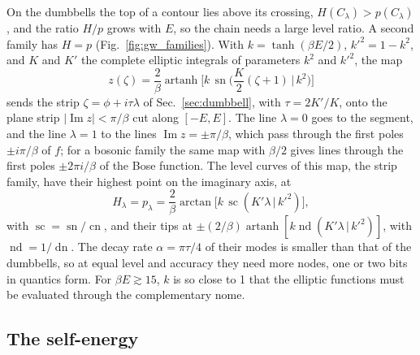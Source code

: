 \documentclass[aps,prb,reprint,a4paper]{revtex4-2}
\newcommand{\sn}{\operatorname{sn}}
\newcommand{\cn}{\operatorname{cn}}
\newcommand{\dn}{\operatorname{dn}}
\DeclareMathOperator{\Imag}{Im}
\begin{document}
On the dumbbells the top of a contour lies above its crossing, $H(C_\lambda)>p(C_\lambda)$, and the ratio $H/p$ grows with $E$, so the chain needs a large level ratio. A second family has $H=p$ (Fig.~\ref{fig:gw_families}). With $k=\tanh(\beta E/2)$, $k'^2=1-k^2$, and $K$ and $K'$ the complete elliptic integrals of parameters $k^2$ and $k'^2$, the map
\begin{equation}
  z(\zeta)=\frac2\beta\operatorname{artanh}\Big[k\,\sn\Big(\frac K2(\zeta+1)\,\Big|\,k^2\Big)\Big]
  \label{eq:strip_map}
\end{equation}
sends the strip $\zeta=\phi+i\tau\lambda$ of Sec.~\ref{sec:dumbbell}, with $\tau=2K'/K$, onto the plane strip $\lvert\Imag z\rvert<\pi/\beta$ cut along $[-E,E]$. The line $\lambda=0$ goes to the segment, and the line $\lambda=1$ to the lines $\Imag z=\pm\pi/\beta$, which pass through the first poles $\pm i\pi/\beta$ of $f$; for a bosonic family the same map with $\beta/2$ gives lines through the first poles $\pm2\pi i/\beta$ of the Bose function. The level curves of this map, the strip family, have their highest point on the imaginary axis, at
\begin{equation}
  H_\lambda=p_\lambda=\frac2\beta\arctan\big[k\,\operatorname{sc}(K'\lambda\,|\,k'^2)\big],
  \label{eq:strip_height}
\end{equation}
with $\operatorname{sc}=\sn/\cn$, and their tips at $\pm(2/\beta)\operatorname{artanh}[k\operatorname{nd}(K'\lambda\,|\,k'^2)]$, with $\operatorname{nd}=1/\dn$. The decay rate $\alpha=\pi\tau/4$ of their modes is smaller than that of the dumbbells, so at equal level and accuracy they need more nodes, one or two bits in quantics form. For $\beta E\gtrsim15$, $k$ is so close to 1 that the elliptic functions must be evaluated through the complementary nome.

\subsection{The self-energy}
\label{sec:gw_sigma}
\end{document}
